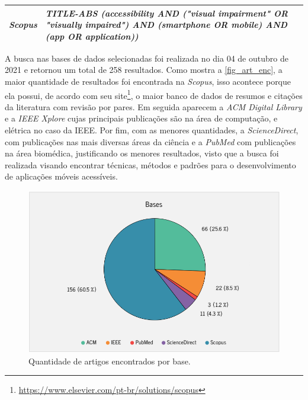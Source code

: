 \begin{quadro}[htb]
\begin{tabular}{|m{3.5cm} | m{11.5cm}|}
    \emph{Scopus}              & \emph{TITLE-ABS (accessibility AND ("visual impairment" OR "visually impaired") AND (smartphone OR mobile) AND (app OR application))}                                                                                                                                                                                                                                                                                                          \\ \hline
  \end{tabular}
\end{quadro}

A busca nas bases de dados selecionadas foi realizada no dia 04 de outubro de 2021 e retornou um total de 258 resultados.
Como mostra a \autoref{fig_art_enc}, a maior quantidade de resultados foi encontrada na \emph{Scopus}, isso acontece porque ela possui, de acordo com seu site\footnote{\url{https://www.elsevier.com/pt-br/solutions/scopus}}, o maior banco de dados de resumos e citações da literatura com revisão por pares.
Em seguida aparecem a \emph{ACM Digital Library} e a \emph{IEEE Xplore} cujas principais publicações são na área de computação, e elétrica no caso da IEEE\@.
Por fim, com as menores quantidades, a \emph{ScienceDirect}, com publicações nas mais diversas áreas da ciência e a \emph{PubMed} com publicações na área biomédica, justificando os menores resultados, visto que a busca foi realizada visando encontrar técnicas, métodos e padrões para o desenvolvimento de aplicações móveis acessíveis.

\begin{figure}[htb]
  \caption{\label{fig_art_enc}Quantidade de artigos encontrados por base.}
  \begin{center}
    \includegraphics[scale=0.7]{Imagens/msl/artigos_encontrados.png}
  \end{center}
\end{figure}

